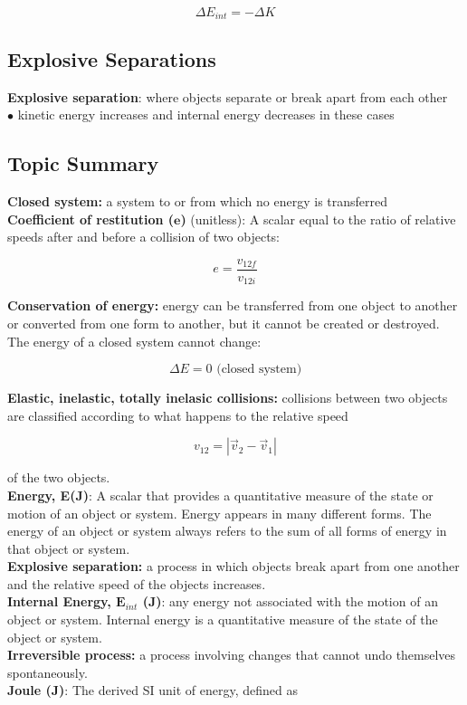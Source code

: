         \[
            \Delta E_{int} = -\Delta K
        \]


    \subsection{Explosive Separations}

        \textbf{Explosive separation}: where objects separate or break apart from each other \\
        $\bullet$ kinetic energy increases and internal energy decreases in these cases

    \subsection{Topic Summary}

        \textbf{Closed system:} a system to or from which no energy is transferred \\
        \textbf{Coefficient of restitution ($\bm{e}$)} (unitless): A scalar equal to the ratio of relative speeds after and before a collision of two objects:

        \[
            e = \frac{v_{12f}}{v_{12i}}
        \]

        \textbf{Conservation of energy:} energy can be transferred from one object to another or converted from one form to another, but it cannot be created or destroyed. The energy of a closed system cannot change:

        \[
            \Delta E = 0 \text{ (closed system)}
        \]

        \textbf{Elastic, inelastic, totally inelasic collisions:} collisions between two objects are classified according to what happens to the relative speed

        \[
            v_{12} = |\overrightarrow{v}_2 - \overrightarrow{v}_1|
        \]

        of the two objects. \\

        \textbf{Energy, E(J)}: A scalar that provides a quantitative measure of the state or motion of an object or system. Energy appears in many different forms. The energy of an object or system always refers to the
        sum of all forms of energy in that object or system. \\
        \textbf{Explosive separation:} a process in which objects break apart from one another and the relative speed of the objects increases. \\
        \textbf{Internal Energy, $\bm{E}_{int}$ (J)}: any energy not associated with the motion of an object or system. Internal energy is a quantitative measure of the state of the object or system. \\
        \textbf{Irreversible process:} a process involving changes that cannot undo themselves spontaneously. \\
        \textbf{Joule (J)}: The derived SI unit of energy, defined as

